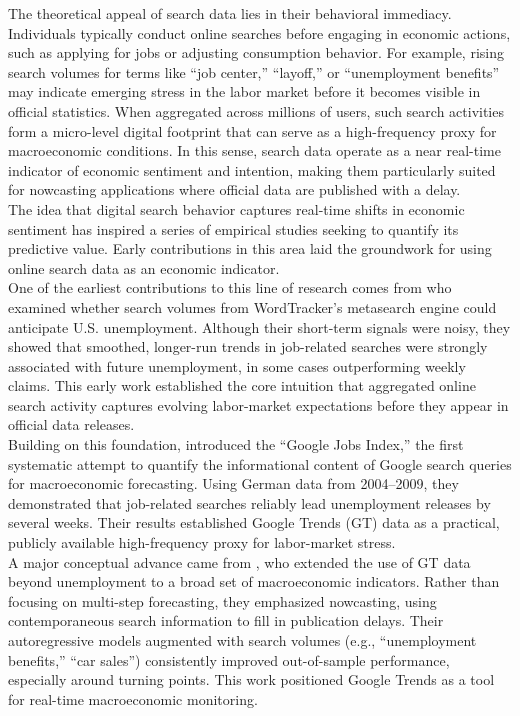 \documentclass[12pt,a4paper]{article}
\begin{document}
The theoretical appeal of search data lies in their behavioral immediacy. Individuals typically conduct online searches before engaging in economic actions, such as applying for jobs or adjusting consumption behavior.
For example, rising search volumes for terms like “job center,” “layoff,” or “unemployment benefits” may indicate emerging stress in the labor market before it becomes visible in official statistics.
When aggregated across millions of users, such search activities form a micro-level digital footprint that can serve as a high-frequency proxy for macroeconomic conditions. In this sense, search data operate as a near real-time indicator of economic sentiment and intention, making them particularly suited for nowcasting applications where official data are published with a delay.
\\
The idea that digital search behavior captures real-time shifts in economic sentiment has inspired a series of empirical studies seeking to quantify its predictive value. Early contributions in this area laid the groundwork for using online search data as an economic indicator.\\
One of the earliest contributions to this line of research comes from \citet{ettrege} who examined whether search volumes from WordTracker’s metasearch engine could anticipate U.S. unemployment. Although their short-term signals were noisy, they showed that smoothed, longer-run trends in job-related searches were strongly associated with future unemployment, in some cases outperforming weekly claims. This early work established the core intuition that aggregated online search activity captures evolving labor-market expectations before they appear in official data releases.\\
Building on this foundation, \citet{Askitas} introduced the “Google Jobs Index,” the first systematic attempt to quantify the informational content of Google search queries for macroeconomic forecasting. Using German data from 2004–2009, they demonstrated that job-related searches reliably lead unemployment releases by several weeks. Their results established Google Trends (GT) data as a practical, publicly available high-frequency proxy for labor-market stress.\\
A major conceptual advance came from \citet{varian}, who extended the use of GT data beyond unemployment to a broad set of macroeconomic indicators. Rather than focusing on multi-step forecasting, they emphasized nowcasting, using contemporaneous search information to fill in publication delays. Their autoregressive models augmented with search volumes (e.g., “unemployment benefits,” “car sales”) consistently improved out-of-sample performance, especially around turning points. This work positioned Google Trends as a tool for real-time macroeconomic monitoring.\\
\end{document}
